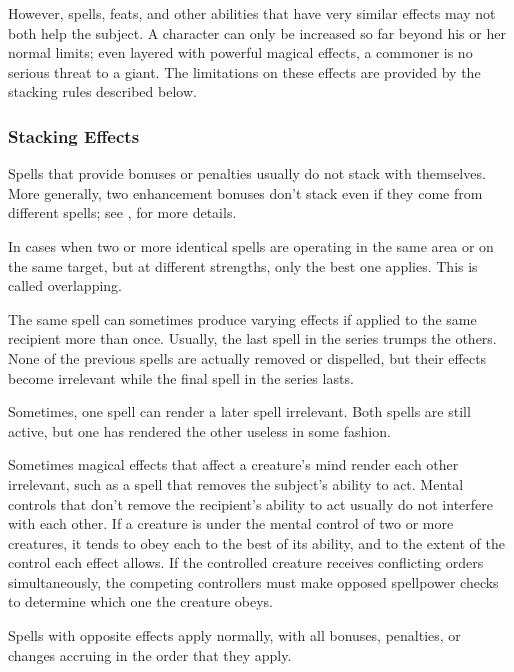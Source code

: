         However, spells, feats, and other abilities that have very similar effects may not both help the subject. A character can only be increased so far beyond his or her normal limits; even layered with powerful magical effects, a commoner is no serious threat to a giant. The limitations on these effects are provided by the stacking rules described below.

        \subsubsection{Stacking Effects}
            Spells that provide bonuses or penalties usually do not stack with themselves. More generally, two enhancement bonuses don't stack even if they come from different spells; see , for more details.

             In cases when two or more identical spells are operating in the same area or on the same target, but at different strengths, only the best one applies. This is called overlapping.

             The same spell can sometimes produce varying effects if applied to the same recipient more than once. Usually, the last spell in the series trumps the others. None of the previous spells are actually removed or dispelled, but their effects become irrelevant while the final spell in the series lasts.

             Sometimes, one spell can render a later spell irrelevant. Both spells are still active, but one has rendered the other useless in some fashion.

             Sometimes magical effects that affect a creature's mind render each other irrelevant, such as a spell that removes the subject's ability to act. Mental controls that don't remove the recipient's ability to act usually do not interfere with each other. If a creature is under the mental control of two or more creatures, it tends to obey each to the best of its ability, and to the extent of the control each effect allows. If the controlled creature receives conflicting orders simultaneously, the competing controllers must make opposed spellpower checks to determine which one the creature obeys.

             Spells with opposite effects apply normally, with all bonuses, penalties, or changes accruing in the order that they apply.

